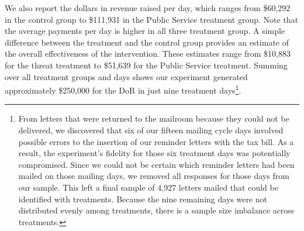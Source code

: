 \documentclass[12pt,titlepage]{article}
\begin{document}
We also report the dollars in revenue raised per day, which ranges
from \$60,292 in the control group to \$111,931 in the Public Service
treatment group. Note that the average payments per day is higher in
all three treatment group. A simple difference between the treatment
and the control group provides an estimate of the overall
effectiveness of the intervention. These estimates range from \$10,883
for the threat treatment to \$51,639 for the Public Service
treatment. Summing over all treatment groups and days shows 
our experiment generated approximately \$250,000 for the DoR in just
nine treatment days\footnote{From letters that were returned to the 
mailroom because they could not be delivered, we discovered that six 
of our fifteen mailing cycle days involved possible errors to the 
insertion of our reminder letters with the tax bill.  As a result, 
the experiment’s fidelity for those six treatment days was 
potentially compromised.  Since we could not be certain which 
reminder letters had been mailed on those mailing days, we removed 
all responses for those days from our sample.  This left a final 
sample of 4,927 letters mailed that could be identified with 
treatments.  Because the nine remaining days were not distributed 
evenly among treatments, there is a sample size imbalance across treatments.}.  
\end{document}
